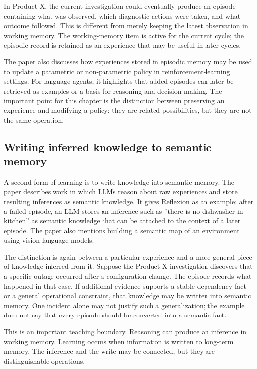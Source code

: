 In Product X, the current investigation could eventually produce an episode containing what was observed, which diagnostic actions were taken, and what outcome followed. This is different from merely keeping the latest observation in working memory. The working-memory item is active for the current cycle; the episodic record is retained as an experience that may be useful in later cycles.

The paper also discusses how experiences stored in episodic memory may be used to update a parametric or non-parametric policy in reinforcement-learning settings. For language agents, it highlights that added episodes can later be retrieved as examples or a basis for reasoning and decision-making. The important point for this chapter is the distinction between preserving an experience and modifying a policy: they are related possibilities, but they are not the same operation.

\subsection{Writing inferred knowledge to semantic memory}

A second form of learning is to write knowledge into semantic memory. The paper describes work in which LLMs reason about raw experiences and store resulting inferences as semantic knowledge. It gives Reflexion as an example: after a failed episode, an LLM stores an inference such as ``there is no dishwasher in kitchen'' as semantic knowledge that can be attached to the context of a later episode. The paper also mentions building a semantic map of an environment using vision-language models.

The distinction is again between a particular experience and a more general piece of knowledge inferred from it. Suppose the Product X investigation discovers that a specific outage occurred after a configuration change. The episode records what happened in that case. If additional evidence supports a stable dependency fact or a general operational constraint, that knowledge may be written into semantic memory. One incident alone may not justify such a generalization; the example does not say that every episode should be converted into a semantic fact.

This is an important teaching boundary. Reasoning can produce an inference in working memory. Learning occurs when information is written to long-term memory. The inference and the write may be connected, but they are distinguishable operations.


